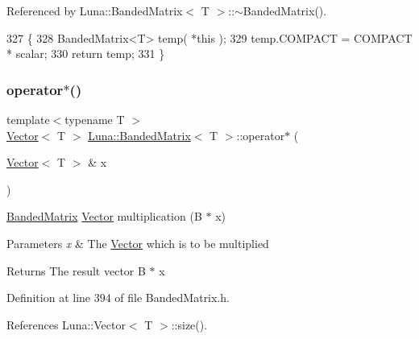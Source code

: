 Referenced by Luna\+::\+Banded\+Matrix$<$ T $>$\+::$\sim$\+Banded\+Matrix().


\begin{DoxyCode}
327   \{
328     BandedMatrix<T> temp( *\textcolor{keyword}{this} );
329     temp.COMPACT = COMPACT * scalar;
330     \textcolor{keywordflow}{return} temp;
331   \}
\end{DoxyCode}
\mbox{\label{classLuna_1_1BandedMatrix_ab41cb941c8a4e2b0d6c49fa0bd57637d}} 
\subsubsection{\texorpdfstring{operator$\ast$()}{operator*()}\hspace{0.1cm}{\footnotesize\ttfamily [2/2]}}
{\footnotesize\ttfamily template$<$typename T $>$ \\
\hyperlink{classLuna_1_1Vector}{Vector}$<$ T $>$ \hyperlink{classLuna_1_1BandedMatrix}{Luna\+::\+Banded\+Matrix}$<$ T $>$\+::operator$\ast$ (\begin{DoxyParamCaption}\item[{\hyperlink{classLuna_1_1Vector}{Vector}$<$ T $>$ \&}]{x }\end{DoxyParamCaption})\hspace{0.3cm}{\ttfamily [inline]}}



\hyperlink{classLuna_1_1BandedMatrix}{Banded\+Matrix} \hyperlink{classLuna_1_1Vector}{Vector} multiplication (B $\ast$ x) 


\begin{DoxyParams}{Parameters}
{\em x} & The \hyperlink{classLuna_1_1Vector}{Vector} which is to be multiplied \\
\hline
\end{DoxyParams}
\begin{DoxyReturn}{Returns}
The result vector B $\ast$ x 
\end{DoxyReturn}


Definition at line 394 of file Banded\+Matrix.\+h.



References Luna\+::\+Vector$<$ T $>$\+::size().


